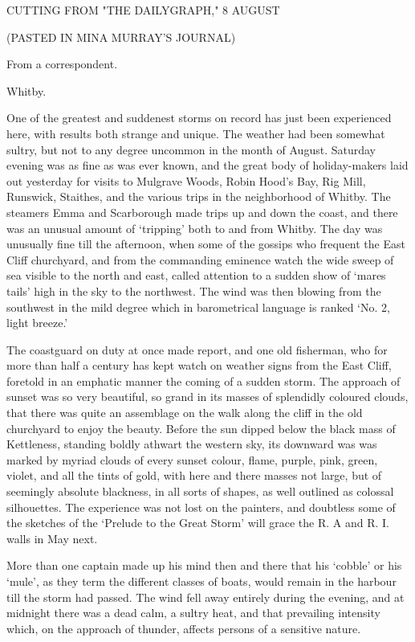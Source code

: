 CUTTING FROM "THE DAILYGRAPH," 8 AUGUST 

(PASTED IN MINA MURRAY'S JOURNAL) 

From a correspondent. 

Whitby. 

One of the greatest and suddenest storms on record has just been experienced here, with results both strange and unique. The weather had been somewhat sultry, but not to any degree uncommon in the month of August. Saturday evening was as fine as was ever known, and the great body of holiday-makers laid out yesterday for visits to Mulgrave Woods, Robin Hood's Bay, Rig Mill, Runswick, Staithes, and the various trips in the neighborhood of Whitby. The steamers Emma and Scarborough made trips up and down the coast, and there was an unusual amount of `tripping' both to and from Whitby. The day was unusually fine till the afternoon, when some of the gossips who frequent the East Cliff churchyard, and from the commanding eminence watch the wide sweep of sea visible to the north and east, called attention to a sudden show of `mares tails' high in the sky to the northwest. The wind was then blowing from the southwest in the mild degree which in barometrical language is ranked `No. 2, light breeze.' 

The coastguard on duty at once made report, and one old fisherman, who for more than half a century has kept watch on weather signs from the East Cliff, foretold in an emphatic manner the coming of a sudden storm. The approach of sunset was so very beautiful, so grand in its masses of splendidly coloured clouds, that there was quite an assemblage on the walk along the cliff in the old churchyard to enjoy the beauty. Before the sun dipped below the black mass of Kettleness, standing boldly athwart the western sky, its downward was was marked by myriad clouds of every sunset colour, flame, purple, pink, green, violet, and all the tints of gold, with here and there masses not large, but of seemingly absolute blackness, in all sorts of shapes, as well outlined as colossal silhouettes. The experience was not lost on the painters, and doubtless some of the sketches of the `Prelude to the Great Storm' will grace the R. A and R. I. walls in May next. 

More than one captain made up his mind then and there that his `cobble' or his `mule', as they term the different classes of boats, would remain in the harbour till the storm had passed. The wind fell away entirely during the evening, and at midnight there was a dead calm, a sultry heat, and that prevailing intensity which, on the approach of thunder, affects persons of a sensitive nature. 

